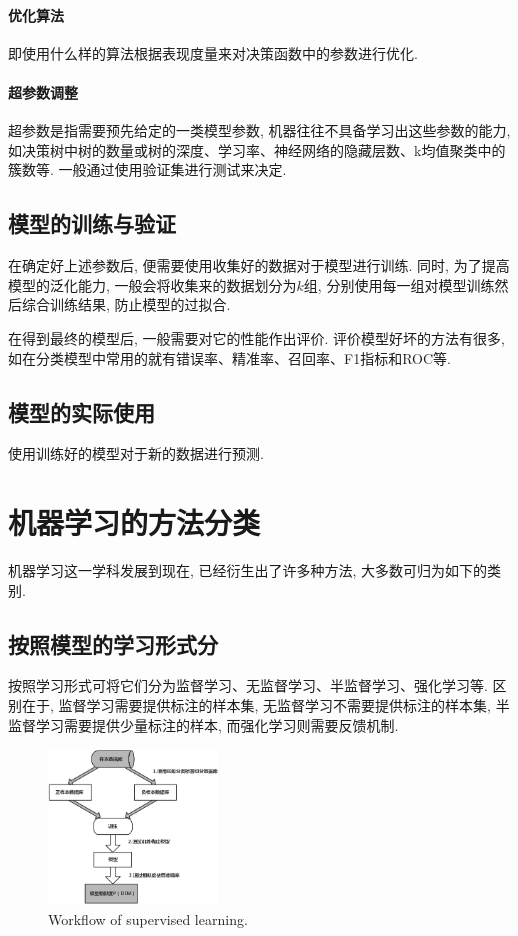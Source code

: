 \documentclass[lang=cn,11pt,a4paper]{elegantpaper}
\begin{document}
\paragraph{优化算法}即使用什么样的算法根据表现度量来对决策函数中的参数进行优化. 
\paragraph{超参数调整}超参数是指需要预先给定的一类模型参数, 机器往往不具备学习出这些参数的能力, 如决策树中树的数量或树的深度、学习率、神经网络的隐藏层数、k均值聚类中的簇数等. 一般通过使用验证集进行测试来决定. 
\subsection{模型的训练与验证}
\par 在确定好上述参数后, 便需要使用收集好的数据对于模型进行训练. 同时, 为了提高模型的泛化能力, 一般会将收集来的数据划分为$k$组, 分别使用每一组对模型训练然后综合训练结果, 防止模型的过拟合. 
\par 在得到最终的模型后, 一般需要对它的性能作出评价. 评价模型好坏的方法有很多, 如在分类模型中常用的就有错误率、精准率、召回率、F1指标和ROC等.
\subsection{模型的实际使用}
\par 使用训练好的模型对于新的数据进行预测.
\section{机器学习的方法分类}
\par 机器学习这一学科发展到现在, 已经衍生出了许多种方法, 大多数可归为如下的类别.
\subsection{按照模型的学习形式分}
按照学习形式可将它们分为监督学习、无监督学习、半监督学习、强化学习等. 区别在于, 监督学习需要提供标注的样本集, 无监督学习不需要提供标注的样本集, 半监督学习需要提供少量标注的样本, 而强化学习则需要反馈机制. 
\begin{figure}[htbp]
	\centering
	\hspace{45pt}\includegraphics[width=0.4\textwidth]{SL}
  	\caption{Workflow of supervised learning.\label{fig:SL}}
\end{figure}
\end{document}
